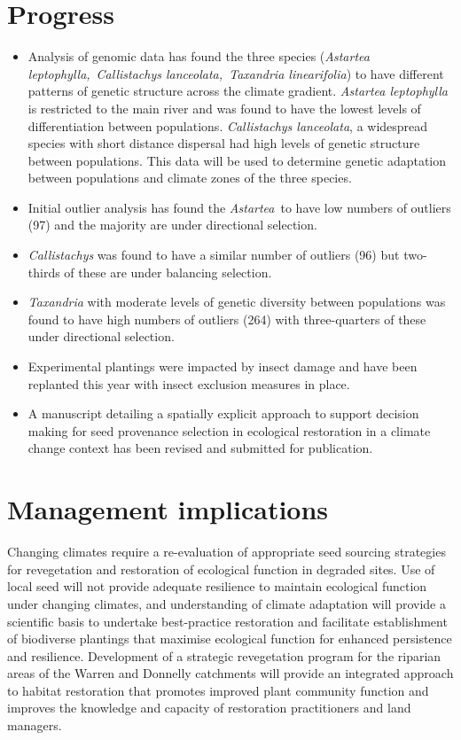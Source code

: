 \documentclass[version=last,
    paper=a4, %
    10pt, %
    usenames,
    dvipsnames,
    oneside, %
    headings=openany, %
    DIV=15 %
]{scrbook}
\begin{document}
\section*{Progress}
\begin{itemize}
\itemsep1pt\parskip0pt
\item
  Analysis of genomic data has found the three species (\emph{Astartea
  leptophylla,}~\emph{Callistachys lanceolata,~Taxandria linearifolia})
  to have different patterns of genetic structure across the climate
  gradient. \emph{Astartea leptophylla} is restricted to the main river
  and was found to have the lowest levels of differentiation between
  populations. \emph{Callistachys lanceolata}, a widespread species with
  short distance dispersal had high levels of genetic structure between
  populations. This data will be used to determine genetic adaptation
  between populations and climate zones of the three species.
\item
  Initial outlier analysis has found the \emph{Astartea}~to have low
  numbers of outliers (97) and the majority are under directional
  selection.
\item
  \emph{Callistachys} was found to have a similar number of outliers
  (96) but two-thirds of these are under balancing selection.
\item
  \emph{Taxandria} with moderate levels of genetic diversity between
  populations was found to have high numbers of outliers (264) with
  three-quarters of these under directional selection.
\item
  Experimental plantings were impacted by insect damage and have been
  replanted this year with insect exclusion measures in place.
\item
  A manuscript detailing a spatially explicit approach to support
  decision making for seed provenance selection in ecological
  restoration in a climate change context has been revised and submitted
  for publication.
\end{itemize}



\section*{Management implications}
Changing climates require a re-evaluation of appropriate seed sourcing
strategies for revegetation and restoration of ecological function in
degraded sites. Use of local seed will not provide adequate resilience
to maintain ecological function under changing climates, and
understanding of climate adaptation will provide a scientific basis to
undertake best-practice restoration and facilitate establishment of
biodiverse plantings that maximise ecological function for enhanced
persistence and resilience. Development of a strategic revegetation
program for the riparian areas of the Warren and Donnelly catchments
will provide an integrated approach to habitat restoration that promotes
improved plant community function and improves the knowledge and
capacity of restoration practitioners and land managers.
\end{document}
